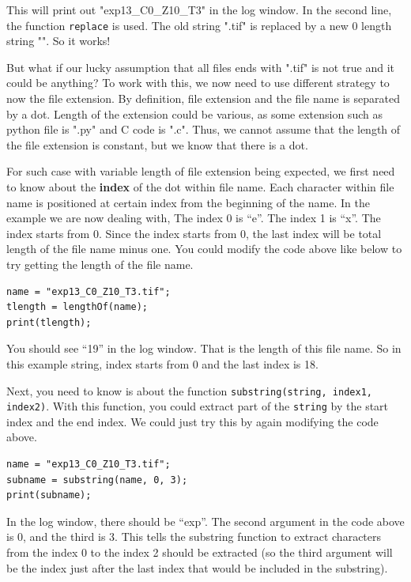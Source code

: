 \documentclass[11pt,a4paper,oneside]{report}
\newcommand{\ilcom}[1]{\texttt{\small#1}}
\begin{document}
This will print out "exp13\_C0\_Z10\_T3" in the log window. In the second line, the function \ilcom{replace} is used. The old string ".tif" is replaced by a new 0 length string "". So it works! 

But what if our lucky assumption that all files ends with ".tif" is not true and it could be anything? To work with this, we now need to use different strategy to now the file extension. By definition, file extension and the file name is separated by a dot. Length of the extension could be various, as some extension such as python file is ".py" and C code is ".c". Thus, we cannot assume that the length of the file extension is constant, but we know that there is a dot. 

For such case with variable length of file extension being expected, we first need to know about the \textbf{index} of the dot within file name. Each character within file name is positioned at certain index from the beginning of the name. In the example we are now dealing with, The index 0 is ``e''. The index 1 is ``x''. The index starts from 0. Since the index starts from 0, the last index will be total length of the file name minus one. You could modify the code above like below to try getting the length of the file name. 

\begin{lstlisting}
name = "exp13_C0_Z10_T3.tif";
tlength = lengthOf(name);
print(tlength);
\end{lstlisting}

You should see ``19'' in the log window. That is the length of this file name. So in this example string, index starts from 0 and the last index is 18. 

Next, you need to know is about the function \ilcom{substring(string, index1, index2)}. With this function, you could extract part of the \ilcom{string} by the start index and the end index. We could just try this by again modifying the code above. 

\begin{lstlisting}
name = "exp13_C0_Z10_T3.tif";
subname = substring(name, 0, 3);
print(subname);
\end{lstlisting}

In the log window, there should be ``exp''. The second argument in the code above is 0, and the third is 3. This tells the substring function to extract characters from the index 0 to the index 2 should be extracted (so the third argument will be the index just after the last index that would be included in the substring). 
\end{document}
